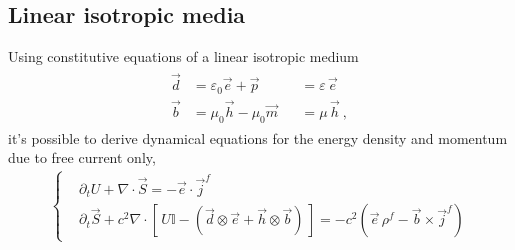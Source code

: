 \documentclass[letterpaper,10pt,english]{jupyterBook}
\begin{document}
\subsection{Linear isotropic media}
\label{\detokenize{ch/energy-momentum-balance:linear-isotropic-media}}
\sphinxAtStartPar
Using constitutive equations of a linear isotropic medium
\begin{equation*}
\begin{split}\begin{aligned}
  \vec{d} & = \varepsilon_0 \vec{e} + \vec{p} && = \varepsilon \, \vec{e} \\
  \vec{b} & = \mu_0 \vec{h} - \mu_0 \vec{m}   && = \mu         \, \vec{h} \ ,
\end{aligned}\end{split}
\end{equation*}
\sphinxAtStartPar
it’s possible to derive dynamical equations for the energy density and momentum due to free current only,
\begin{equation*}
\begin{split}\begin{cases}
& \partial_t U + \nabla \cdot \vec{S} = - \vec{e} \cdot \vec{j}^f \\
& \partial_t \vec{S} + c^2 \nabla \cdot \left[ \, U \mathbb{I} - \left( \vec{d} \otimes \vec{e} + \vec{h} \otimes \vec{b} \right) \, \right] = - c^2 \left( \vec{e} \, \rho^f - \vec{b} \times \vec{j}^f \right)
\end{cases}\end{split}
\end{equation*}
\sphinxAtStartPar
{} 
\end{document}

